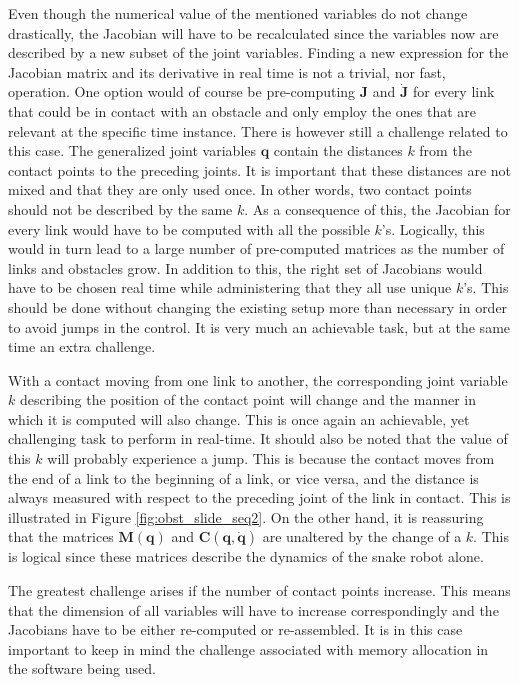 Even though the numerical value of the mentioned variables do not change drastically, the Jacobian will have to be recalculated since the variables now are described by a new subset of the joint variables. Finding a new expression for the Jacobian matrix and its derivative in real time is not a trivial, nor fast, operation. One option would of course be pre-computing $\mathbf{J}$ and $\dot{\mathbf{J}}$ for every link that could be in contact with an obstacle and only employ the ones that are relevant at the specific time instance. There is however still a challenge related to this case. The generalized joint variables $\mathbf{q}$ contain the distances $k$ from the contact points to the preceding joints. It is important that these distances are not mixed and that they are only used once. In other words, two contact points should not be described by the same $k$. As a consequence of this, the Jacobian for every link would have to be computed with all the possible $k$'s. Logically, this would in turn lead to a large number of pre-computed matrices as the number of links and obstacles grow. In addition to this, the right set of Jacobians would have to be chosen real time while administering that they all use unique $k$'s. This should be done without changing the existing setup more than necessary in order to avoid jumps in the control. It is very much an achievable task, but at the same time an extra challenge.

With a contact moving from one link to another, the corresponding joint variable $k$ describing the position of the contact point will change and the manner in which it is computed will also change. This is once again an achievable, yet challenging task to perform in real-time. It should also be noted that the value of this $k$ will probably experience a jump. This is because the contact moves from the end of a link to the beginning of a link, or vice versa, and the distance is always measured with respect to the preceding joint of the link in contact. This is illustrated in Figure \ref{fig:obst_slide_seq2}. On the other hand, it is reassuring that the matrices $\mathbf{M(q)}$ and $\mathbf{C(q,\dot{q})}$ are unaltered by the change of a $k$. This is logical since these matrices describe the dynamics of the snake robot alone.

The greatest challenge arises if the number of contact points increase. This means that the dimension of all variables will have to increase correspondingly and the Jacobians have to be either re-computed or re-assembled. It is in this case important to keep in mind the challenge associated with memory allocation in the software being used.

